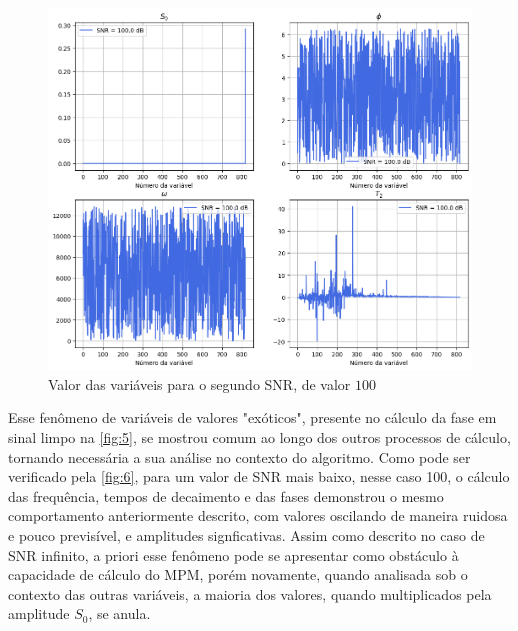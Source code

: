 \documentclass[12pt]{article}
\begin{document}
\begin{figure} [H]
    \centering
    \includegraphics[scale=0.4166]{var-1.png}
    \caption{Valor das variáveis para o segundo SNR, de valor $100$}
    \label{fig:6}
\end{figure}

Esse fenômeno de variáveis de valores "exóticos", presente no cálculo da fase em sinal limpo na \autoref{fig:5}, se mostrou comum ao longo dos outros processos de 
cálculo, tornando necessária a sua análise no contexto do algoritmo. Como pode ser verificado pela \autoref{fig:6}, para um valor de SNR mais baixo, nesse caso 100, 
o cálculo das frequência, tempos de decaimento e das fases demonstrou o mesmo comportamento anteriormente descrito, com valores oscilando de maneira ruidosa e pouco 
previsível, e amplitudes signficativas. Assim como descrito no caso de SNR infinito, a priori esse fenômeno pode se apresentar como obstáculo à capacidade de cálculo 
do MPM, porém novamente, quando analisada sob o contexto das outras variáveis, a maioria dos valores, quando multiplicados pela amplitude $S_0$, se anula.
\end{document}
